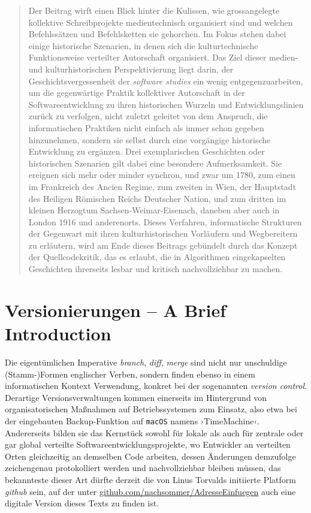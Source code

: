 \documentclass[a4paper,12pt]{article}
\newcommand{\inanf}[1]{›#1‹}
\begin{document}
\begin{abstract}
Der Beitrag wirft einen Blick hinter die Kulissen, wie grossangelegte kollektive Schreibprojekte medientechnisch organisiert sind und welchen Befehlssätzen und Befehlsketten sie gehorchen. Im Fokus stehen dabei einige historische Szenarien, in denen sich die kulturtechnische Funktionsweise verteilter Autorschaft organisiert. Das Ziel dieser medien- und kulturhistorischen Perspektivierung liegt darin, der Geschichtsvergessenheit der \emph{software studies} ein wenig entgegenzuarbeiten, um die gegenwärtige Praktik kollektiver Autorschaft in der Softwareentwicklung zu ihren historischen Wurzeln und Entwicklungslinien zurück zu verfolgen, nicht zuletzt geleitet von dem Anspruch, die informatischen Praktiken nicht einfach als immer schon gegeben hinzunehmen, sondern sie selbst durch eine vorgängige historische Entwicklung zu ergänzen. Drei exemplarischen Geschichten oder historischen Szenarien gilt dabei eine besondere Aufmerksamkeit. Sie ereignen sich mehr oder minder synchron, und zwar um 1780, zum einen im Frankreich des Ancien Regime, zum zweiten in Wien, der Hauptstadt des Heiligen Römischen Reichs Deutscher Nation, und zum dritten im kleinen Herzogtum Sachsen-Weimar-Eisenach, daneben aber auch in London 1916 und anderenorts. Dieses Verfahren, informatische Strukturen der Gegenwart mit ihren kulturhistorischen Vorläufern und Wegbereitern zu erläutern, wird am Ende dieses Beitrags gebündelt durch das Konzept der Quellcodekritik, das es erlaubt, die in Algorithmen eingekapselten Geschichten ihrerseits lesbar und kritisch nachvollziehbar zu machen. 
\end{abstract}



\section{Versionierungen – A Brief Introduction}

Die eigentümlichen Imperative \emph{branch}, \emph{diff}, \emph{merge} sind nicht nur unschuldige (Stamm-)Formen englischer Verben, sondern finden ebenso in einem informatischen Kontext Verwendung, konkret bei der sogenannten \emph{version control}. Derartige Versionsverwaltungen kommen einerseits im Hintergrund von organisatorischen Maßnahmen auf Betriebssystemen zum Einsatz, also etwa bei der eingebauten Backup-Funktion auf \verb+macOS+ namens \inanf{TimeMachine}. Andererseits bilden sie das Kernstück sowohl für lokale als auch für zentrale oder gar global verteilte Softwareentwicklungsprojekte, wo Entwickler an verteilten Orten gleichzeitig an demselben Code arbeiten, dessen Änderungen demzufolge zeichengenau protokolliert werden und nachvollziehbar bleiben müssen, das bekannteste dieser Art dürfte derzeit die von Linus Torvalds initiierte Platform \emph{github} sein, auf der unter \href{https://github.com/nachsommer}{github.com/nachsommer/AdresseEinfuegen} auch eine digitale Version dieses Texts zu finden ist. 
\end{document}
